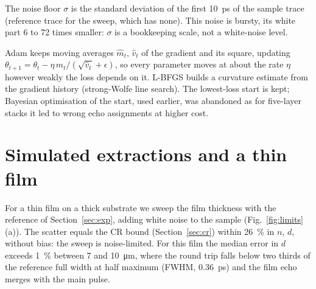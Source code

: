 \documentclass{optica-article}
\begin{document}
The noise floor $\sigma$ is the standard deviation of the first \SI{10}{\pico\second} of the sample trace (reference trace for the sweep, which has none). This noise is bursty, its white part 6 to 72 times smaller: $\sigma$ is a bookkeeping scale, not a white-noise level.

Adam keeps moving averages $\hat m_t$, $\hat v_t$ of the gradient and its square, updating $\theta_{t+1}=\theta_t-\eta\,\hat m_t/(\sqrt{\hat v_t}+\epsilon)$, so every parameter moves at about the rate $\eta$ however weakly the loss depends on it. L-BFGS builds a curvature estimate from the gradient history (strong-Wolfe line search). The lowest-loss start is kept; Bayesian optimisation of the start, used earlier, was abandoned as for five-layer stacks it led to wrong echo assignments at higher cost.

\section{Simulated extractions and a thin film}\label{sec:sim}
For a thin film on a thick substrate we sweep the film thickness with the reference of Section~\ref{sec:exp}, adding white noise to the sample (Fig.~\ref{fig:limits}(a)). The scatter equals the CR bound (Section~\ref{sec:cr}) within \SI{26}{\percent} in $n$, $d$, without bias: the sweep is noise-limited. For this film the median error in $d$ exceeds \SI{1}{\percent} between 7 and \SI{10}{\micro\metre}, where the round trip falls below two thirds of the reference full width at half maximum (FWHM, \SI{0.36}{\pico\second}) and the film echo merges with the main pulse.
\end{document}
